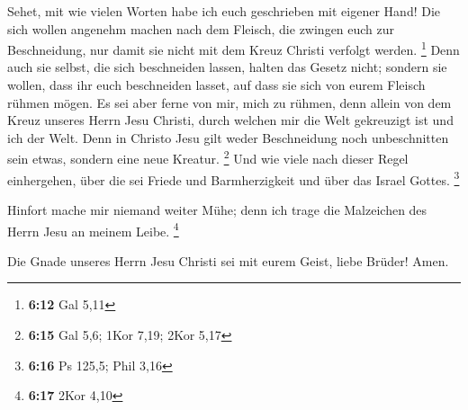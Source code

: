  Sehet, mit wie vielen Worten habe ich euch geschrieben
mit eigener Hand!  Die sich wollen angenehm machen nach
dem Fleisch, die zwingen euch zur Beschneidung, nur damit sie nicht mit
dem Kreuz Christi verfolgt werden. \footnote{\textbf{6:12} Gal 5,11}
 Denn auch sie selbst, die sich beschneiden lassen,
halten das Gesetz nicht; sondern sie wollen, dass ihr euch beschneiden
lasset, auf dass sie sich von eurem Fleisch rühmen mögen.
 Es sei aber ferne von mir, mich zu rühmen, denn allein
von dem Kreuz unseres Herrn Jesu Christi, durch welchen mir die Welt
gekreuzigt ist und ich der Welt.  Denn in Christo Jesu
gilt weder Beschneidung noch unbeschnitten sein etwas, sondern eine neue
Kreatur. \footnote{\textbf{6:15} Gal 5,6; 1Kor 7,19; 2Kor 5,17}
 Und wie viele nach dieser Regel einhergehen, über die
sei Friede und Barmherzigkeit und über das Israel Gottes. \footnote{\textbf{6:16}
  Ps 125,5; Phil 3,16}

 Hinfort mache mir niemand weiter Mühe; denn ich trage
die Malzeichen des Herrn Jesu an meinem Leibe. \footnote{\textbf{6:17}
  2Kor 4,10}

 Die Gnade unseres Herrn Jesu Christi sei mit eurem
Geist, liebe Brüder! Amen.
